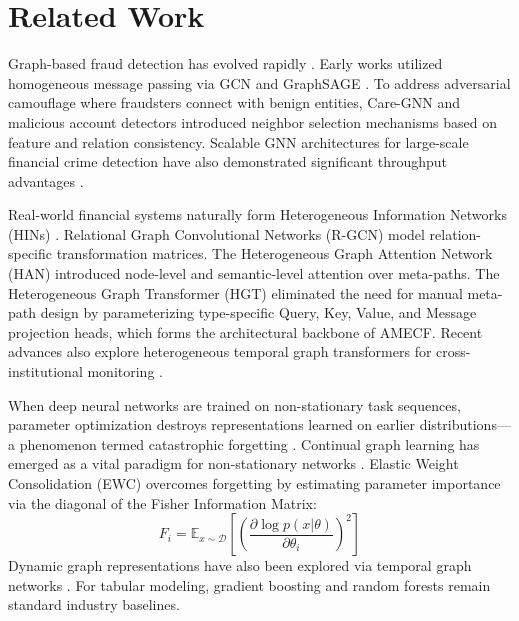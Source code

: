 \documentclass[conference]{IEEEtran}
\begin{document}
\section{Related Work}
Graph-based fraud detection has evolved rapidly \cite{sannidhanam2023graph}. Early works utilized homogeneous message passing via GCN \cite{kipf2017semi} and GraphSAGE \cite{hamilton2017inductive}. To address adversarial camouflage where fraudsters connect with benign entities, Care-GNN \cite{dou2020enhancing} and malicious account detectors \cite{liu2018heterogeneous} introduced neighbor selection mechanisms based on feature and relation consistency. Scalable GNN architectures for large-scale financial crime detection have also demonstrated significant throughput advantages \cite{weber2022scalable}.

Real-world financial systems naturally form Heterogeneous Information Networks (HINs) \cite{ju2023financial}. Relational Graph Convolutional Networks (R-GCN) \cite{schlichtkrull2018modeling} model relation-specific transformation matrices. The Heterogeneous Graph Attention Network (HAN) \cite{wang2019heterogeneous} introduced node-level and semantic-level attention over meta-paths. The Heterogeneous Graph Transformer (HGT) \cite{hu2020heterogeneous} eliminated the need for manual meta-path design by parameterizing type-specific Query, Key, Value, and Message projection heads, which forms the architectural backbone of AMECF. Recent advances also explore heterogeneous temporal graph transformers for cross-institutional monitoring \cite{wang2024heterogeneous}.

When deep neural networks are trained on non-stationary task sequences, parameter optimization destroys representations learned on earlier distributions---a phenomenon termed catastrophic forgetting \cite{french1999catastrophic}. Continual graph learning has emerged as a vital paradigm for non-stationary networks \cite{zhang2024continual}. Elastic Weight Consolidation (EWC) \cite{kirkpatrick2017overcoming} overcomes forgetting by estimating parameter importance via the diagonal of the Fisher Information Matrix:
\begin{equation}
F_i = \mathbb{E}_{x \sim \mathcal{D}}\left[ \left(\frac{\partial \log p(x|\theta)}{\partial \theta_i}\right)^2 \right]
\label{eq:fisher}
\end{equation}
Dynamic graph representations have also been explored via temporal graph networks \cite{rossi2020temporal}. For tabular modeling, gradient boosting \cite{chen2016xgboost} and random forests \cite{breiman2001random} remain standard industry baselines.
\end{document}
